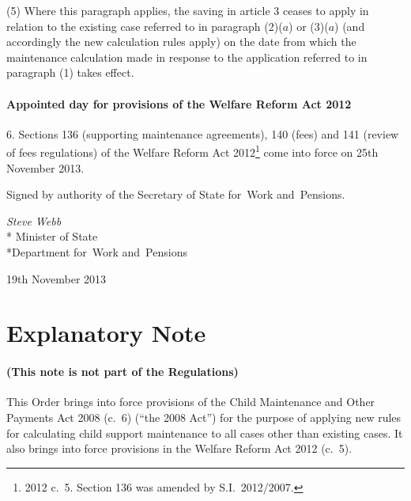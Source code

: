 \documentclass[12pt,a4paper]{article}
\begin{document}
(5) Where this paragraph applies, the saving in article 3 ceases to apply in relation to the existing case referred to in paragraph (2)($a$)  or (3)($a$)  (and accordingly the new calculation rules apply) on the date from which the maintenance calculation made in response to the application referred to in paragraph (1) takes effect.

\subsection[6. Appointed day for provisions of the Welfare Reform Act 2012]{Appointed day for provisions of the Welfare Reform Act 2012}

6.  Sections 136 (supporting maintenance agreements), 140 (fees) and 141 (review of fees regulations) of the Welfare Reform Act 2012\footnote{2012 c.~5. Section 136 was amended by S.I.~2012/2007.} come into force on 25th November 2013. 

\bigskip

\pagebreak[3]

Signed 
by authority of the 
Secretary of State for~Work and~Pensions.

{\raggedleft
\emph{Steve Webb}\\*
Minister
of State\\*Department 
for~Work and~Pensions

}

19th November 2013

\small

\part{Explanatory Note}

\renewcommand\parthead{— Explanatory Note}

\subsection*{(This note is not part of the Regulations)}

This Order brings into force provisions of the Child Maintenance and Other Payments Act 2008 (c.~6) (“the 2008 Act”) for the purpose of applying new rules for calculating child support maintenance to all cases other than existing cases. It also brings into force provisions in the Welfare Reform Act 2012 (c.~5).
\end{document}
